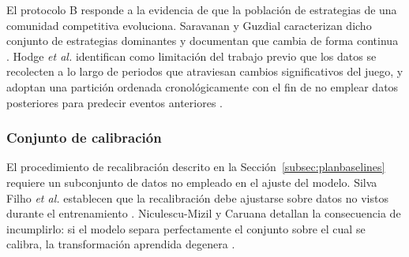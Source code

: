 El protocolo B responde a la evidencia de que la población de estrategias
de una comunidad competitiva evoluciona. Saravanan y Guzdial caracterizan
dicho conjunto de estrategias dominantes y documentan que cambia de forma
continua \cite{saravanan_metadiscovery_2024}. Hodge \textit{et al.}
identifican como limitación del trabajo previo que los datos se recolecten
a lo largo de periodos que atraviesan cambios significativos del juego, y
adoptan una partición ordenada cronológicamente con el fin de no emplear
datos posteriores para predecir eventos anteriores
\cite{hodge_winprediction_2021}.



\subsubsection{Conjunto de calibración}

El procedimiento de recalibración descrito en la
Sección~\ref{subsec:planbaselines} requiere un subconjunto de datos no
empleado en el ajuste del modelo. Silva Filho \textit{et al.} establecen
que la recalibración debe ajustarse sobre datos no vistos durante el
entrenamiento \cite{silvafilho_calibration_2023}. Niculescu-Mizil y Caruana
detallan la consecuencia de incumplirlo: si el modelo separa perfectamente
el conjunto sobre el cual se calibra, la transformación aprendida degenera
\cite{niculescumizil_probabilities_2005}.


